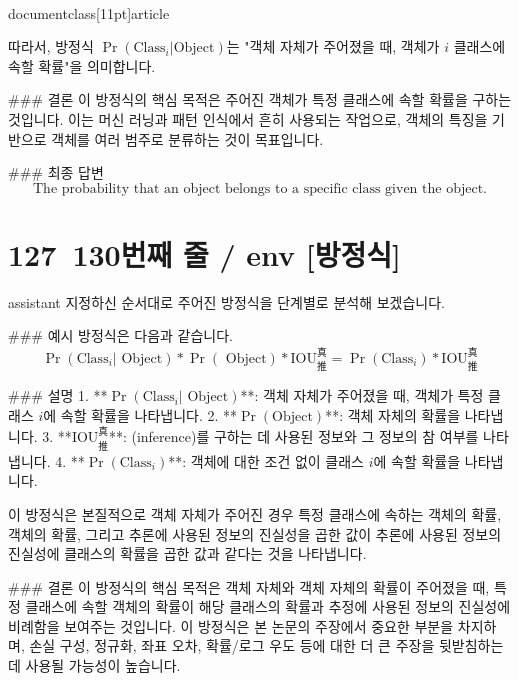 \\documentclass[11pt]{article}
\begin{document}
따라서, 방정식 \(\Pr(\textrm{Class}_i | \textrm{Object})\)는 "객체 자체가 주어졌을 때, 객체가 \(i\) 클래스에 속할 확률"을 의미합니다.

### 결론
이 방정식의 핵심 목적은 주어진 객체가 특정 클래스에 속할 확률을 구하는 것입니다. 이는 머신 러닝과 패턴 인식에서 흔히 사용되는 작업으로, 객체의 특징을 기반으로 객체를 여러 범주로 분류하는 것이 목표입니다.

### 최종 답변
\[
\boxed{\text{The probability that an object belongs to a specific class given the object.}}
\]

\section*{127~130번째 줄 / env [방정식]}
assistant
지정하신 순서대로 주어진 방정식을 단계별로 분석해 보겠습니다.

### 예시
방정식은 다음과 같습니다.
\[
\Pr(\textrm{Class}_i | \textrm{ Object}) * \Pr(\textrm{ Object}) * \textrm{IOU}_{\textrm{推}}^{\textrm{真}} = \Pr(\textrm{Class}_i) * \textrm{IOU}_{\textrm{推}}^{\textrm{真}}
\]

### 설명
1. **\(\Pr(\textrm{Class}_i | \textrm{ Object})\)**: 객체 자체가 주어졌을 때, 객체가 특정 클래스 \(i\)에 속할 확률을 나타냅니다.
2. **\(\Pr(\textrm{Object})\)**: 객체 자체의 확률을 나타냅니다.
3. **\(\textrm{IOU}_{\textrm{推}}^{\textrm{真}}\)**: (inference)를 구하는 데 사용된 정보와 그 정보의 참 여부를 나타냅니다.
4. **\(\Pr(\textrm{Class}_i)\)**: 객체에 대한 조건 없이 클래스 \(i\)에 속할 확률을 나타냅니다.

이 방정식은 본질적으로 객체 자체가 주어진 경우 특정 클래스에 속하는 객체의 확률, 객체의 확률, 그리고 추론에 사용된 정보의 진실성을 곱한 값이 추론에 사용된 정보의 진실성에 클래스의 확률을 곱한 값과 같다는 것을 나타냅니다.

### 결론
이 방정식의 핵심 목적은 객체 자체와 객체 자체의 확률이 주어졌을 때, 특정 클래스에 속할 객체의 확률이 해당 클래스의 확률과 추정에 사용된 정보의 진실성에 비례함을 보여주는 것입니다. 이 방정식은 본 논문의 주장에서 중요한 부분을 차지하며, 손실 구성, 정규화, 좌표 오차, 확률/로그 우도 등에 대한 더 큰 주장을 뒷받침하는 데 사용될 가능성이 높습니다.
\end{document}

